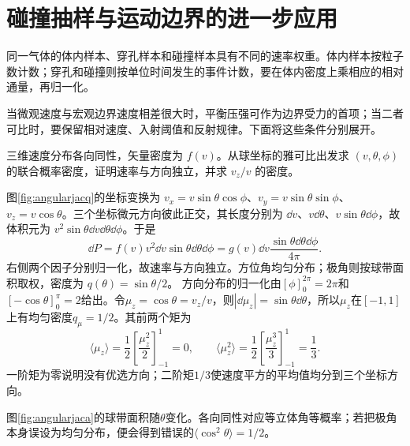 \section{碰撞抽样与运动边界的进一步应用}
同一气体的体内样本、穿孔样本和碰撞样本具有不同的速率权重。体内样本按粒子数计数；穿孔和碰撞则按单位时间发生的事件计数，要在体内密度上乘相应的相对通量，再归一化。

当微观速度与宏观边界速度相差很大时，平衡压强可作为边界受力的首项；当二者可比时，要保留相对速度、入射阈值和反射规律。下面将这些条件分别展开。

\begin{example}[由球坐标变换核算方向概率]
三维速度分布各向同性，矢量密度为 $f(v)$。从球坐标的雅可比出发求 $(v,\theta,\phi)$ 的联合概率密度，证明速率与方向独立，并求 $v_z/v$ 的密度。
\end{example}
\begin{solution}
图\ref{fig:angularjacq}的坐标变换为 $v_x=v\sin\theta\cos\phi$、$v_y=v\sin\theta\sin\phi$、$v_z=v\cos\theta$。三个坐标微元方向彼此正交，其长度分别为 $\dd v$、$v\dd\theta$、$v\sin\theta\dd\phi$，故体积元为 $v^2\sin\theta\dd v\dd\theta\dd\phi$。于是
\[
 \dd P=f(v)v^2\dd v\sin\theta\dd\theta\dd\phi
 =g(v)\dd v\frac{\sin\theta\dd\theta\dd\phi}{4\pi}.
\]
右侧两个因子分别归一化，故速率与方向独立。方位角均匀分布；极角则按球带面积取权，密度为 $q(\theta)=\sin\theta/2$。
方向分布的归一化由$[\phi]_0^{2\pi}=2\pi$和$[-\cos\theta]_0^\pi=2$给出。令$\mu_z=\cos\theta=v_z/v$，则$|\dd\mu_z|=\sin\theta\dd\theta$，所以$\mu_z$在$[-1,1]$上有均匀密度$q_\mu=1/2$。其前两个矩为
\[
 \langle\mu_z\rangle=\frac12\left[\frac{\mu_z^2}{2}\right]_{-1}^1=0,
 \qquad \langle\mu_z^2\rangle=\frac12\left[\frac{\mu_z^3}{3}\right]_{-1}^1=\frac13.
\]
一阶矩为零说明没有优选方向；二阶矩$1/3$使速度平方的平均值均分到三个坐标方向。

图\ref{fig:angularjaca}的球带面积随$\theta$变化。各向同性对应等立体角等概率；若把极角本身误设为均匀分布，便会得到错误的$\langle\cos^2\theta\rangle=1/2$。
\end{solution}


